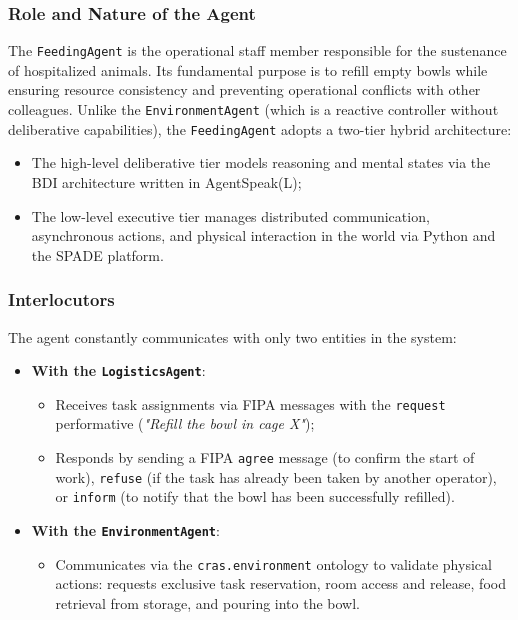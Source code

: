 \documentclass{article}
\renewcommand{\_}{\oldtextunderscore\allowbreak}
\begin{document}
\subsubsection{Role and Nature of the Agent}
The \texttt{FeedingAgent} is the operational staff member responsible for the sustenance of hospitalized animals. Its fundamental purpose is to refill empty bowls while ensuring resource consistency and preventing operational conflicts with other colleagues.
Unlike the \texttt{EnvironmentAgent} (which is a reactive controller without deliberative capabilities), the \texttt{FeedingAgent} adopts a two-tier hybrid architecture:
\begin{itemize}
    \item The high-level deliberative tier models reasoning and mental states via the BDI architecture written in AgentSpeak(L);
    \item The low-level executive tier manages distributed communication, asynchronous actions, and physical interaction in the world via Python and the SPADE platform.
\end{itemize}
\subsubsection{Interlocutors}
The agent constantly communicates with only two entities in the system:
\begin{itemize}
    \item \textbf{With the \texttt{LogisticsAgent}}:
    \begin{itemize}
        \item Receives task assignments via FIPA messages with the \texttt{request} performative (\textit{"Refill the bowl in cage X"});
        \item Responds by sending a FIPA \texttt{agree} message (to confirm the start of work), \texttt{refuse} (if the task has already been taken by another operator), or \texttt{inform} (to notify that the bowl has been successfully refilled).
    \end{itemize}
    \item \textbf{With the \texttt{EnvironmentAgent}}:
    \begin{itemize}
        \item Communicates via the \texttt{cras.environment} ontology to validate physical actions: requests exclusive task reservation, room access and release, food retrieval from storage, and pouring into the bowl.
    \end{itemize}
\end{itemize}
\end{document}
